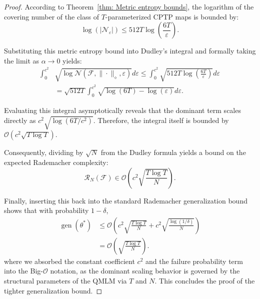 \documentclass[%
 reprint,
superscriptaddress,
 amsmath,amssymb,
 aps,
]{revtex4-2}
\begin{document}
\begin{proof}
    According to Theorem~\ref{thm: Metric entropy bounds}, the logarithm of the covering number of the class of $T$-parameterized CPTP maps is bounded by:
    \begin{equation}
        \log(|\mathcal{N}_\varepsilon|) \le 512T\log\left(\frac{6T}{\varepsilon}\right).
    \end{equation}
    
    Substituting this metric entropy bound into Dudley's integral and formally taking the limit as $\alpha \to 0$ yields:
    \begin{equation}
    \begin{split}
        \int_{0}^{c^2} &\sqrt{\log \mathcal{N}\left(\mathcal{F}, \|\cdot\|_\diamond, \varepsilon\right)} d\varepsilon \le \int_{0}^{c^2} \sqrt{512T\log\left(\frac{6T}{\varepsilon}\right)} d\varepsilon \\
        &= \sqrt{512T} \int_{0}^{c^2} \sqrt{\log(6T) - \log(\varepsilon)} d\varepsilon.
    \end{split}
    \end{equation}
    
    Evaluating this integral asymptotically reveals that the dominant term scales directly as $c^2 \sqrt{\log(6T/c^2)}$. Therefore, the integral itself is bounded by $\mathcal{O}\left( c^2 \sqrt{T \log T} \right)$.
    
    Consequently, dividing by $\sqrt{N}$ from the Dudley formula yields a bound on the expected Rademacher complexity:
    \begin{equation}
        \mathcal{R}_N(\mathcal{F}) \in \mathcal{O}\left(c^2 \sqrt{\frac{T \log T}{N}}\right).
    \end{equation}
    
    Finally, inserting this back into the standard Rademacher generalization bound shows that with probability $1-\delta$,
    \begin{equation}
        \begin{split}
        \operatorname{gen}\left(\theta^*\right) &\le \mathcal{O}\left( c^2 \sqrt{\frac{T \log T}{N}} + c^2 \sqrt{\frac{\log(1/\delta)}{N}} \right)\\
        &= \mathcal{O}\left(\sqrt{\frac{T \log T}{N}}\right).
    \end{split}
    \end{equation}
    where we absorbed the constant coefficient $c^2$ and the failure probability term into the Big-$\mathcal{O}$ notation, as the dominant scaling behavior is governed by the structural parameters of the QMLM via $T$ and $N$. This concludes the proof of the tighter generalization bound.
\end{proof}
\end{document}
